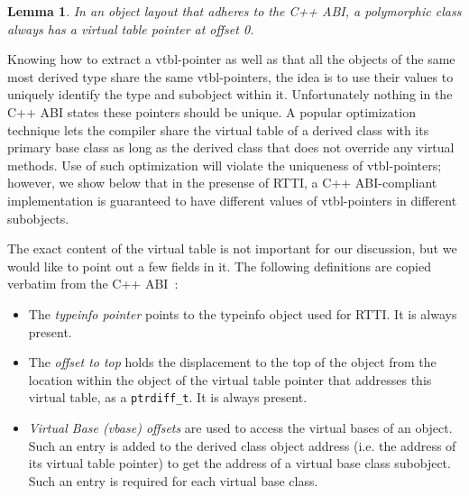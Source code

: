 \documentclass[preprint]{sigplanconf}
\makeatletter
\DeclareRobustCommand{\code}[1]{{\lstinline[breaklines=false,escapechar=@]{#1}}}
\newtheorem{lemma}{Lemma}
\makeatother
\begin{document}
\begin{lemma}
In an object layout that adheres to the C++ ABI, a polymorphic class always has a 
virtual table pointer at offset 0.
\label{lem:vtbl}
\end{lemma}

\noindent
Knowing how to extract a vtbl-pointer as well as that all the objects of the 
same most derived type share the same vtbl-pointers, the idea is to use their 
values to uniquely identify the type and subobject within it. Unfortunately 
nothing in the C++ ABI states these pointers should be unique. A popular 
optimization technique lets the compiler share the virtual table of a derived 
class with its primary base class as long as the derived class that does not 
override any virtual methods. Use of such optimization will violate the 
uniqueness of vtbl-pointers; however, we show below that in the presense of 
RTTI, a C++ ABI-compliant implementation is guaranteed to have different values 
of vtbl-pointers in different subobjects.



The exact content of the virtual table is not important for our discussion, but 
we would like to point out a few fields in it. The following definitions are 
copied verbatim from the C++ ABI~\cite[.2]{C++ABI}:

\begin{itemize}
\setlength{\itemsep}{0pt}
\setlength{\parskip}{0pt}
\item The \emph{typeinfo pointer} points to the typeinfo object used for RTTI. 
      It is always present.  
\item The \emph{offset to top} holds the displacement to the top of the object 
      from the location within the object of the virtual table pointer that 
      addresses this virtual table, as a \code{ptrdiff_t}. It is always present.
\item \emph{Virtual Base (vbase) offsets} are used to access the virtual bases 
      of an object. Such an entry is added to the derived class object address 
      (i.e. the address of its virtual table pointer) to get the address of a 
      virtual base class subobject. Such an entry is required for each virtual 
      base class.
\end{itemize}
\end{document}
